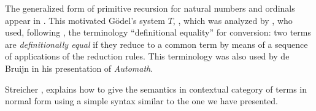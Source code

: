   The generalized form of primitive recursion for natural numbers and ordinals
  appear in \cite{Hilbert-1925}.  This motivated G\"odel's system $T$,
  \cite{Goedel-T-1958}, which was analyzed by \cite{Tait-1966}, who used,
  following \cite{Goedel-1958}, the terminology ``definitional equality'' for
  conversion: two terms are {\em definitionally equal} if they reduce to a
  common term by means of a sequence of applications of the reduction
  rules. This terminology was also used by de Bruijn \cite{deBruijn-1973} in his
  presentation of {\em Automath}.

  Streicher \cite[Theorem 4.13]{Streicher-1991}, explains how to give the
  semantics in contextual category of terms in normal form using a simple syntax
  similar to the one we have presented.

